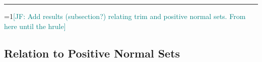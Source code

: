 \documentclass[11pt]{article}
\newcommand{\Comments}{1}
\newcommand{\mynote}[2]{\ifnum\Comments=1\textcolor{#1}{#2}\fi}
\newcommand{\mytodo}[2]{\ifnum\Comments=1%
  \todo[linecolor=#1!80!black,backgroundcolor=#1,bordercolor=#1!80!black]{#2}\fi}
\newcommand{\jessie}[1]{\mynote{teal}{[JF: #1]}}
\newcommand{\btw}[1]{\mytodo{gray!20!white}{BTW: #1}}%
\newcommand{\reals}{\mathbb{R}}
\newcommand{\prop}[1]{\mathrm{prop}[#1]}
\newcommand{\simplex}{\Delta_\Y}
\newcommand{\R}{\mathcal{R}}
\newcommand{\U}{\mathcal{U}}
\newcommand{\Y}{\mathcal{Y}}
\newcommand{\inprod}[2]{\langle #1, #2 \rangle}%
\newcommand{\toto}{\rightrightarrows}
\newcommand{\trim}{\mathrm{trim}}
\newcommand{\trimred}{\mathrm{trim}}
\newcommand{\trimcover}{\mathrm{trim}}
\newtheorem{corollary}{Corollary}
\newtheorem{definition}{Definition}
\begin{document}
%
%
%
%
%


\iffalse
\hrule
\bigskip
\jessie{Add results (subsection?) relating trim and positive normal sets.  From here until the hrule}
\subsection{Relation to Positive Normal Sets}
\end{document}
